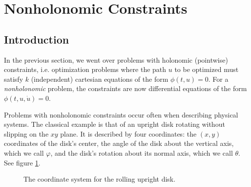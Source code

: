 \documentclass{article}
\theoremstyle{plain}
\theoremstyle{nonumberplain}
\begin{document}
\section{Nonholonomic Constraints}\label{sec:nonholonomic}

\subsection{Introduction}

In the previous section, we went over problems with holonomic (pointwise) constraints, i.e. optimization problems where the path $u$ to be optimized must satisfy $k$ (independent) cartesian equations of the form $\phi(t,u) = 0$. For a \emph{nonholonomic} problem, the constraints are now differential equations of the form $\phi(t,u,\dot u) = 0$.

Problems with nonholonomic constraints occur often when describing physical systems. The classical example is that of an upright disk rotating without slipping on the $xy$ plane. It is described by four coordinates: the $(x,y)$ coordinates of the disk's center, the angle of the disk about the vertical axis, which we call $\varphi$, and the disk's rotation about its normal axis, which we call $\theta$. See figure \ref{diskfigure}.

\begin{figure}
\centering
{}
\label{diskfigure}
\caption{The coordinate system for the rolling upright disk.}
\end{figure}
\end{document}
